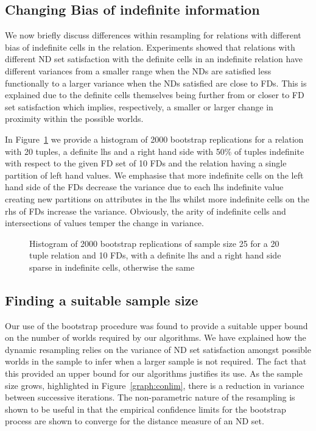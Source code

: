 \subsection{Changing Bias of indefinite information}\label{subsec:cp_bias}

We now briefly discuss differences within resampling for relations
with different bias of indefinite cells in the relation. Experiments
showed that relations with different ND set satisfaction with the
definite cells in an indefinite relation have different variances
from a smaller range when the NDs are satisfied less functionally to a
larger variance when the NDs satisfied are close to FDs. This is
explained due to the definite cells themselves being further from or
closer to FD set satisfaction which implies, respectively, a smaller
or larger change in proximity within the possible worlds.

\smallskip

In Figure~\ref{graph:cp_hist1} we provide a histogram of
2000 bootstrap replications for a relation with 20 tuples, a
definite lhs and a right hand side with 50\% of tuples indefinite with
respect to the given FD set of 10 FDs and the relation having a single
partition of left hand values.
We emphasise that more indefinite cells on the left hand side of the
FDs decrease the variance due to each lhs indefinite value creating
new partitions on attributes in the lhs whilst more indefinite cells
on the rhs of FDs increase the variance. Obviously, the arity of
indefinite cells and intersections of values temper the change in
variance. 


\begin{figure}
\centerline{}
\caption{\label{graph:cp_hist1} {Histogram of 2000 bootstrap
replications of sample size 25 for a 20 tuple relation and 10 FDs,
with a definite lhs and a right hand side sparse in indefinite cells,
otherwise the same}} 
\end{figure}


\subsection{Finding a suitable sample size}

Our use of the bootstrap procedure was found to provide a suitable
upper bound on the number of worlds required by our algorithms. We
have explained how the dynamic resampling relies on the variance of ND
set satisfaction amongst possible worlds in the sample to infer when a
larger sample is not required.  The fact that this provided an upper
bound for our algorithms justifies its use. 
As the sample size grows, highlighted in
Figure~\ref{graph:conlim}, there is a reduction in variance between
successive iterations. The non-parametric nature of the resampling is
shown to be useful in that the empirical confidence limits for
the bootstrap process are
shown to converge for the distance measure of an ND set.


